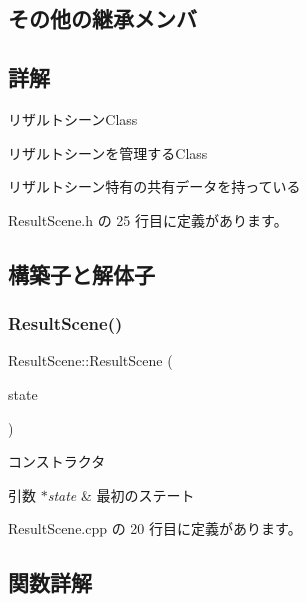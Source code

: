 \subsection*{その他の継承メンバ}


\subsection{詳解}
リザルトシーン\+Class 

リザルトシーンを管理する\+Class

リザルトシーン特有の共有データを持っている 

 Result\+Scene.\+h の 25 行目に定義があります。



\subsection{構築子と解体子}
\mbox{\label{class_result_scene_ac184d41a92125eda200a132fe7aadd2e}} 
\subsubsection{\texorpdfstring{Result\+Scene()}{ResultScene()}}
{\footnotesize\ttfamily Result\+Scene\+::\+Result\+Scene (\begin{DoxyParamCaption}\item[{\mbox{\hyperlink{class_scene_base_1_1_state_base}{State\+Base}} $\ast$}]{state }\end{DoxyParamCaption})}



コンストラクタ 


\begin{DoxyParams}{引数}
{\em $\ast$state} & 最初のステート \\
\hline
\end{DoxyParams}


 Result\+Scene.\+cpp の 20 行目に定義があります。



\subsection{関数詳解}
\mbox{\label{class_result_scene_a222b1c39e96888c43ae2111726576768}} 
